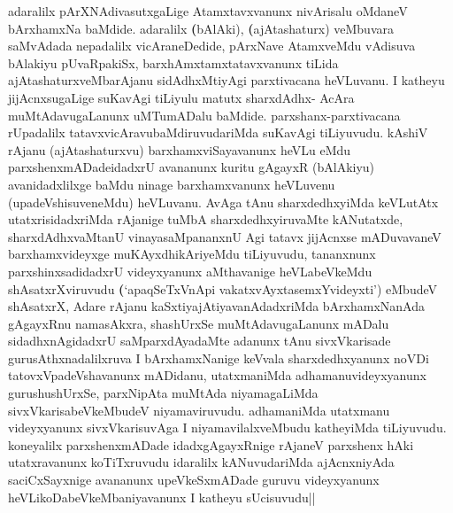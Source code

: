 \begin{artha}
adaralilx pArXNAdivasutxgaLige Atamxtavxvanunx nivArisalu oMdaneV bArxhamxNa \break	 baMdide. adaralilx \textbf(bAlAki), \textbf(ajAtashaturx) veMbuvara saMvAdada nepadalilx vicAra\-neDedide, pArxNave AtamxveMdu vAdisuva bAlakiyu pUvaRpakiSx, barxhAmxtamxtatavxvanunx tiLida ajAtashaturxveMbarAjanu sidAdhxMtiyAgi parxtivacana heVLuvanu. I katheyu jijAcnxsugaLige suKavAgi tiLiyulu matutx sharxdAdhx- AcAra muMtAdavugaLanunx uMTumADalu baMdide. parxshanx-parxtivacana rUpadalilx tatavxvicAravubaMdiruvuda\-riMda suKavAgi tiLiyuvudu. kAshiV rAjanu (ajAtashaturxvu) barxhamxviSaya\-vanunx heVLu eMdu parxshenxmADadeidadxrU avananunx kuritu gAgayxR (bAlAkiyu) avani\-dadxlilxge baMdu ninage barxhamxvanunx heVLuvenu (upadeVshisuveneMdu) heVLuvanu. AvAga tAnu sharxdedhxyiMda keVLutAtx utatxrisidadxriMda rAjanige tuMbA sharxdedhxyiru\-vaMte kANutatxde, sharxdAdhxvaMtanU vinayasaMpananxnU Agi tatavx jijAcnxse \-mADuvavaneV barxhamxvideyxge muKAyxdhikAriyeMdu tiLiyuvudu, tananxnunx parxshinxsadidadxrU \-videyxyanunx aMthavanige heVLabeVkeMdu shAsatxrXviruvudu \textbf(`apaqSeTxVnApi vakatxvAyxtasemxYvideyxti') \-eMbudeV shAsatxrX, Adare rAjanu kaSxtiyajAtiyavanAdadxriMda bArxhamxNanAda gAgayxRnu namasAkxra, shashUrxSe muMtAdavugaLanunx mADalu sidadhxnAgidadxrU saMparxdAyadaMte adanunx tAnu sivxVkarisade gurusAthxnadalilxruva I bArxhamxNanige keVvala sharxdedhxyanunx noVDi tatovxVpadeVshavanunx mADidanu, utatxmaniMda adhamanuvideyxyanunx guru\-shushUrxSe, parxNipAta muMtAda niyamagaLiMda sivxVkarisabeVkeMbudeV niyamaviru\-vudu. adhamaniMda utatxmanu videyxyanunx sivxVkarisuvAga I niyamavilalx\-veMbudu katheyiMda tiLiyuvudu. koneyalilx parxshenxmADade idadxgAgayxRnige rAjaneV parxshenx hAki utatxravanunx koTiTxruvudu idaralilx kANuvudariMda ajAcnxniyAda saciCxSayxnige avananunx upeVkeSxmADade guruvu videyxyanunx heVLikoDabeVkeMbaniyavanunx I katheyu sUcisuvudu||
\end{artha}

